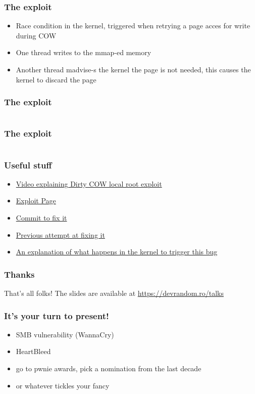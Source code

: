 \documentclass{beamer}
\begin{document}
\begin{frame}
  \frametitle{The exploit}
  \begin{itemize}
  \item Race condition in the kernel, triggered when retrying a page acces for write during COW
  \item One thread writes to the mmap-ed memory
  \item Another thread madvise-s the kernel the page is not needed, this causes the kernel to discard the page
  \end{itemize}
\end{frame}

\begin{frame}
  \frametitle{The exploit}
  \inputminted[fontsize=\footnotesize]{c}{snippets/exploit-madv.c}
\end{frame}

\begin{frame}
  \frametitle{The exploit}
  \inputminted[fontsize=\footnotesize]{c}{snippets/exploit-self-mem.c}
\end{frame}

\begin{frame}
  \frametitle{Useful stuff}
  \begin{itemize}
  \item \href{https://www.youtube.com/watch?v=kEsshExn7aE}{Video explaining Dirty COW local root exploit}
  \item \href{https://github.com/dirtycow/dirtycow.github.io/wiki/VulnerabilityDetails}{Exploit Page}
  \item \href{https://github.com/torvalds/linux/commit/19be0eaffa3ac7d8eb6784ad9bdbc7d67ed8e619}{Commit to fix it}
  \item \href{https://github.com/torvalds/linux/commit/4ceb5db9757aaeadcf8fbbf97d76bd42aa4df0d6}{Previous attempt at fixing it}
  \item \href{https://chao-tic.github.io/blog/2017/05/24/dirty-cow}{An explanation of what happens in the kernel to trigger this bug}
    
  \end{itemize}
\end{frame}

\begin{frame}
  \frametitle{Thanks}
  That's all folks!
  \newline
  \newline
  The slides are available at
  \href{https://devrandom.ro/talks}{https://devrandom.ro/talks}
\end{frame}


\begin{frame}
  \frametitle{It's your turn to present!}
  \begin{itemize}
  \item SMB vulnerability (WannaCry)
  \item HeartBleed 
  \item go to pwnie awards, pick a nomination from the last decade
  \item or whatever tickles your fancy
  \end{itemize}
\end{frame}
\end{document}
